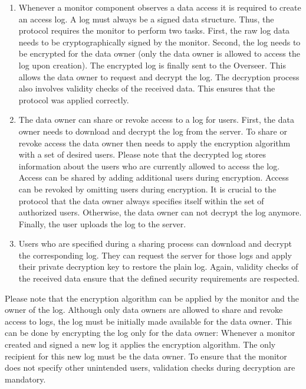 \documentclass[../main.tex]{subfiles}
\begin{document}
\begin{enumerate}
    \item
    Whenever a monitor component observes a data access it is required to create an access log.
    A log must always be a signed data structure.
    Thus, the protocol requires the monitor to perform two tasks.
    First, the raw log data needs to be cryptographically signed by the monitor.
    Second, the log needs to be encrypted for the data owner (only the data owner is allowed to access the log upon creation).
    The encrypted log is finally sent to the Overseer.
    This allows the data owner to request and decrypt the log.
    The decryption process also involves validity checks of the received data.
    This ensures that the protocol was applied correctly.
    \item 
    The data owner can share or revoke access to a log for users.
    First, the data owner needs to download and decrypt the log from the server.
    To share or revoke access the data owner then needs to apply the encryption algorithm with a set of desired users.
    Please note that the decrypted log stores information about the users who are currently allowed to access the log.
    Access can be shared by adding additional users during encryption.
    Access can be revoked by omitting users during encryption.
    It is crucial to the protocol that the data owner always specifies itself within the set of authorized users.
    Otherwise, the data owner can not decrypt the log anymore.
    Finally, the user uploads the log to the server.
    \item
    Users who are specified during a sharing process can download and decrypt the corresponding log.
    They can request the server for those logs and apply their private decryption key to restore the plain log.
    Again, validity checks of the received data ensure that the defined security requirements are respected.
    
\end{enumerate}

Please note that the encryption algorithm can be applied by the monitor and the owner of the log.
Although only data owners are allowed to share and revoke access to logs, the log must be initially made available for the data owner.
This can be done by encrypting the log only for the data owner:
Whenever a monitor created and signed a new log it applies the encryption algorithm.
The only recipient for this new log must be the data owner.
To ensure that the monitor does not specify other unintended users, validation checks during decryption are mandatory.
\end{document}
